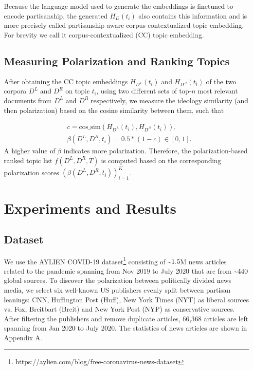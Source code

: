 \documentclass[11pt]{article}
\begin{document}
Because the language model used to generate the embeddings is finetuned to encode partisanship, the generated $H_{D}(t_i)$ also contains this information and is more precisely called partisanship-aware corpus-contextualized topic embedding. For brevity we call it corpus-contextualized (CC) topic embedding. 


\subsection{Measuring Polarization and Ranking Topics}
\label{sec:measuring_pola}
After obtaining the CC topic embeddings $H_{D^L}(t_i)$ and $H_{D^R}(t_i)$ of the two corpora $D^L$ and $D^R$ on topic $t_i$, using two different sets of top-$n$ most relevant documents from $D^L$ and $D^R$ respectively, we measure the ideology similarity (and then polarization) based on the cosine similarity between them, such that

\begin{equation}
\begin{aligned}
& c  = \text{cos\_sim}(H_{D^L}(t_i), H_{D^R}(t_i)), \\
& \beta(D^L, D^R, t_i) = 0.5*(1-c) \in [0,1].
\end{aligned}
\end{equation}
A higher value of $\beta$ indicates more polarization. Therefore, the polarization-based ranked topic list $f(D^L, D^R, T)$ is computed based on the corresponding polarization scores $( \beta(D^L, D^R, t_i) )_{i=1}^{K}$.

\section{Experiments and Results}

\subsection{Dataset}
We use the AYLIEN COVID-19 dataset\footnote{https://aylien.com/blog/free-coronavirus-news-dataset} consisting of \textasciitilde$1.5$M news articles related to the pandemic spanning from Nov 2019 to July 2020 that are from \textasciitilde440 global sources. To discover the polarization between politically divided news media, we select six well-known US publishers evenly split between partisan leanings: CNN, Huffington Post (Huff), New York Times (NYT) as liberal sources vs.  Fox, Breitbart (Breit) and New York Post (NYP) as conservative sources.
After filtering the publishers and remove duplicate articles, 66,368 articles are left spanning from Jan 2020 to July 2020. The statistics of news articles are shown in Appendix A. 
\end{document}

